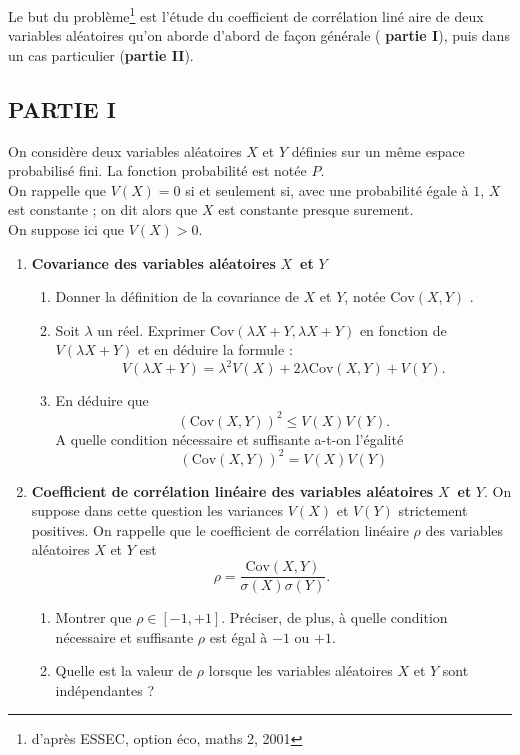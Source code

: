 \noindent Le but du probl\`eme\footnote{d'après ESSEC, option éco, maths 2, 2001} est l'\'etude du coefficient de corr\'elation lin\'e%
aire de deux variables al\'eatoires qu'on aborde d'abord de fa\c con g\'en\'erale (%
\textbf{partie I}), puis dans un cas particulier (\textbf{partie II}).

\subsection*{PARTIE I}

On consid\`ere deux variables al\'eatoires $X$ et $Y$ d\'efinies sur un m\^eme
espace probabilis\'e fini. La fonction probabilité est notée $P$.\\
 On rappelle que $V(X)=0$
si et seulement si, avec une probabilit\'e \'egale \`a $1$, $X$ est constante ; on dit alors que $X$ est constante presque surement.\\
On suppose ici que $V(X)>0$. 

\begin{enumerate}
\item \textbf{Covariance des variables al\'eatoires }$X$\textbf{\ et }$Y$

\begin{enumerate}
\item Donner la définition de la covariance de $X$ et $Y$, notée $\mathrm{Cov}(X,Y)$ . 
\item Soit $\lambda$ un réel. Exprimer $\mathrm{Cov}(\lambda X+Y,\lambda X+Y)$ en fonction de $V(\lambda X+Y)$
et en d\'eduire la formule :
\begin{equation*}
V(\lambda X+Y)=\lambda ^{2}V(X)+2\lambda \mathrm{Cov}(X,Y)+V(Y).
\end{equation*}

\item En d\'eduire que $$\left(\mathrm{Cov}(X,Y)\right)^{2}\leqslant V(X)V(Y).$$
A quelle condition n\'ecessaire et suffisante a-t-on l'\'egalit\'e $$%
(\mathrm{Cov}(X,Y))^{2}=V(X)V(Y)$$
\end{enumerate}

\item \textbf{Coefficient de corr\'elation lin\'eaire des variables al\'eatoires }$%
X$\textbf{\ et }$Y.$\newline
On suppose dans cette question les variances $V(X)$ et $V(Y)$ strictement positives. On rappelle que  le coefficient de corr\'elation lin\'eaire $\rho $ des variables
al\'eatoires $X$ et $Y$ est 
 $$\rho =\frac{\mathrm{Cov}%
\left( X,Y\right) }{\sigma \left( X\right) \sigma \left( Y\right) }.$$

\begin{enumerate}
\item  
 Montrer que $\rho \in[-1,+1]$. Pr\'eciser, de plus, \`a quelle condition n\'ecessaire et suffisante $\rho $ est \'egal \`a $-1$ ou $+1$.

\item Quelle est la valeur de $\rho $ lorsque les variables al\'eatoires $X$ et $Y$ sont ind\'ependantes ?

\end{enumerate}
\end{enumerate}


